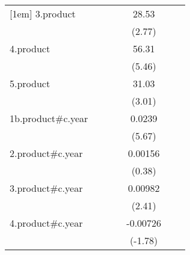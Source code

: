 {\begin{tabular}{l*{6}{c}}
[1em]
3.product           &                     &                     &                     &       28.53\sym{**} &                     &                     \\
                    &                     &                     &                     &      (2.77)         &                     &                     \\
[1em]
4.product           &                     &                     &                     &       56.31\sym{***}&                     &                     \\
                    &                     &                     &                     &      (5.46)         &                     &                     \\
[1em]
5.product           &                     &                     &                     &       31.03\sym{**} &                     &                     \\
                    &                     &                     &                     &      (3.01)         &                     &                     \\
[1em]
1b.product#c.year   &                     &                     &                     &      0.0239\sym{***}&                     &                     \\
                    &                     &                     &                     &      (5.67)         &                     &                     \\
[1em]
2.product#c.year    &                     &                     &                     &     0.00156         &                     &                     \\
                    &                     &                     &                     &      (0.38)         &                     &                     \\
[1em]
3.product#c.year    &                     &                     &                     &     0.00982\sym{*}  &                     &                     \\
                    &                     &                     &                     &      (2.41)         &                     &                     \\
[1em]
4.product#c.year    &                     &                     &                     &    -0.00726         &                     &                     \\
                    &                     &                     &                     &     (-1.78)         &                     &                     \\

\end{tabular}}
